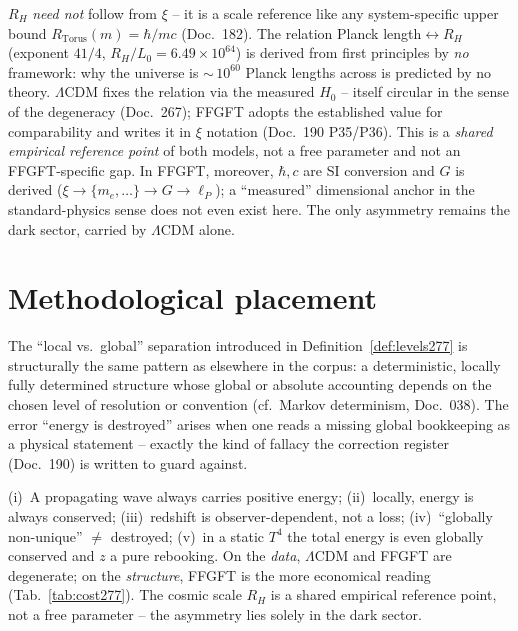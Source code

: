\begin{remark}
$R_H$ \emph{need not} follow from $\xi$ -- it is a scale reference like any
system-specific upper bound $R_\text{Torus}(m)=\hbar/mc$ (Doc.~182). The
relation Planck length$\leftrightarrow R_H$ (exponent $41/4$,
$R_H/L_0 = 6.49\times10^{64}$) is derived from first principles by \emph{no}
framework: why the universe is $\sim$\,$10^{60}$ Planck lengths across is
predicted by no theory. $\Lambda$CDM fixes the relation via the measured $H_0$
-- itself circular in the sense of the degeneracy (Doc.~267); FFGFT adopts the
established value for comparability and writes it in $\xi$ notation (Doc.~190
P35/P36). This is a \emph{shared empirical reference point} of both models, not
a free parameter and not an FFGFT-specific gap. In FFGFT, moreover, $\hbar, c$
are SI conversion and $G$ is derived ($\xi\to\{m_e,\ldots\}\to G\to\ell_P$);
a \enquote{measured} dimensional anchor in the standard-physics sense does not
even exist here. The only asymmetry remains the dark sector, carried by
$\Lambda$CDM alone.
\end{remark}

\section{Methodological placement}

The \enquote{local vs.\ global} separation introduced in
Definition~\ref{def:levels277} is structurally the same pattern as elsewhere in
the corpus: a deterministic, locally fully determined structure whose global or
absolute accounting depends on the chosen level of resolution or convention
(cf.\ Markov determinism, Doc.~038). The error \enquote{energy is destroyed}
arises when one reads a missing global bookkeeping as a physical statement --
exactly the kind of fallacy the correction register (Doc.~190) is written to
guard against.

\begin{insight}
(i)~A propagating wave always carries positive energy; (ii)~locally, energy is
always conserved; (iii)~redshift is observer-dependent, not a loss;
(iv)~\enquote{globally non-unique} $\neq$ destroyed; (v)~in a static $T^4$ the
total energy is even globally conserved and $z$ a pure rebooking. On the
\emph{data}, $\Lambda$CDM and FFGFT are degenerate; on the \emph{structure},
FFGFT is the more economical reading (Tab.~\ref{tab:cost277}). The cosmic scale
$R_H$ is a shared empirical reference point, not a free parameter -- the
asymmetry lies solely in the dark sector.
\end{insight}

